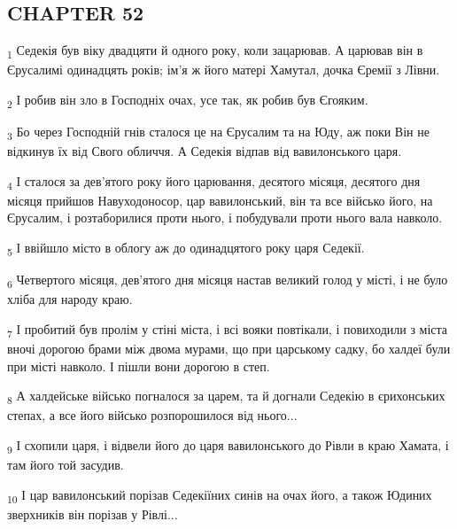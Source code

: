\subsection{CHAPTER 52}
\begin{tcolorbox}
\textsubscript{1} Седекія був віку двадцяти й одного року, коли зацарював. А царював він в Єрусалимі одинадцять років; ім'я ж його матері Хамутал, дочка Єремії з Лівни.
\end{tcolorbox}
\begin{tcolorbox}
\textsubscript{2} І робив він зло в Господніх очах, усе так, як робив був Єгояким.
\end{tcolorbox}
\begin{tcolorbox}
\textsubscript{3} Бо через Господній гнів сталося це на Єрусалим та на Юду, аж поки Він не відкинув їх від Свого обличчя. А Седекія відпав від вавилонського царя.
\end{tcolorbox}
\begin{tcolorbox}
\textsubscript{4} І сталося за дев'ятого року його царювання, десятого місяця, десятого дня місяця прийшов Навуходоносор, цар вавилонський, він та все військо його, на Єрусалим, і розтаборилися проти нього, і побудували проти нього вала навколо.
\end{tcolorbox}
\begin{tcolorbox}
\textsubscript{5} І ввійшло місто в облогу аж до одинадцятого року царя Седекії.
\end{tcolorbox}
\begin{tcolorbox}
\textsubscript{6} Четвертого місяця, дев'ятого дня місяця настав великий голод у місті, і не було хліба для народу краю.
\end{tcolorbox}
\begin{tcolorbox}
\textsubscript{7} І пробитий був пролім у стіні міста, і всі вояки повтікали, і повиходили з міста вночі дорогою брами між двома мурами, що при царському садку, бо халдеї були при місті навколо. І пішли вони дорогою в степ.
\end{tcolorbox}
\begin{tcolorbox}
\textsubscript{8} А халдейське військо погналося за царем, та й догнали Седекію в єрихонських степах, а все його військо розпорошилося від нього...
\end{tcolorbox}
\begin{tcolorbox}
\textsubscript{9} І схопили царя, і відвели його до царя вавилонського до Рівли в краю Хамата, і там його той засудив.
\end{tcolorbox}
\begin{tcolorbox}
\textsubscript{10} І цар вавилонський порізав Седекіїних синів на очах його, а також Юдиних зверхників він порізав у Рівлі...
\end{tcolorbox}
